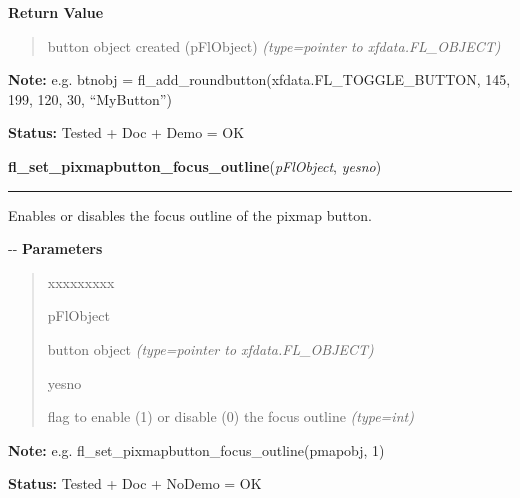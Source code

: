 \begin{boxedminipage}{\funcwidth}
      \textbf{Return Value}
    \vspace{-1ex}

      \begin{quote}

button object created (pFlObject)
      {\it (type=pointer to xfdata.FL\_OBJECT)}

      \end{quote}

\textbf{Note:} 
e.g. btnobj = fl\_add\_roundbutton(xfdata.FL\_TOGGLE\_BUTTON, 145,
199, 120, 30, ``MyButton'')


\textbf{Status:} 
Tested + Doc + Demo = OK


    \end{boxedminipage}

    \label{xformslib:flbutton:fl_set_pixmapbutton_focus_outline}

    \vspace{0.5ex}

\hspace{.8\funcindent}\begin{boxedminipage}{\funcwidth}

    \raggedright \textbf{fl\_set\_pixmapbutton\_focus\_outline}(\textit{pFlObject}, \textit{yesno})

    \vspace{-1.5ex}

    \rule{\textwidth}{0.5\fboxrule}
\setlength{\parskip}{2ex}

Enables or disables the focus outline of the pixmap button.

-{}-
\setlength{\parskip}{1ex}
      \textbf{Parameters}
      \vspace{-1ex}

      \begin{quote}
        \begin{Ventry}{xxxxxxxxx}

          \item[pFlObject]


button object
            {\it (type=pointer to xfdata.FL\_OBJECT)}

          \item[yesno]


flag to enable (1) or disable (0) the focus outline
            {\it (type=int)}

        \end{Ventry}

      \end{quote}

\textbf{Note:} 
e.g. fl\_set\_pixmapbutton\_focus\_outline(pmapobj, 1)


\textbf{Status:} 
Tested + Doc + NoDemo = OK


    \end{boxedminipage}

